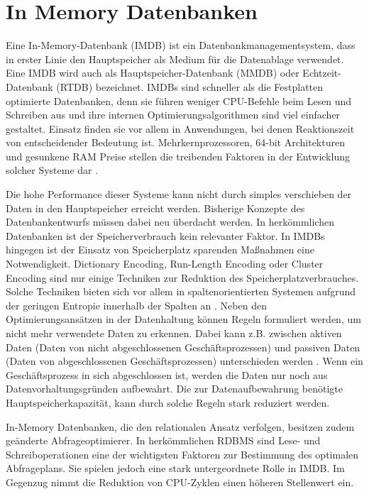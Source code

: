 \section{In Memory Datenbanken}
\label{ch:grundlagen:sec:InMemoryDatenbanken}

Eine In-Memory-Datenbank (IMDB) ist ein Datenbankmanagementsystem, dass in erster Linie den Hauptspeicher als Medium für die Datenablage verwendet. Eine IMDB wird auch als Hauptspeicher-Datenbank (MMDB) oder Echtzeit-Datenbank (RTDB) bezeichnet. IMDBs sind schneller als die Festplatten optimierte Datenbanken, denn sie führen weniger CPU-Befehle beim Lesen und Schreiben aus und ihre internen Optimierungsalgorithmen sind viel einfacher gestaltet. Einsatz finden sie vor allem in Anwendungen, bei denen Reaktionszeit von entscheidender Bedeutung ist. Mehrkernprozessoren, 64-bit Architekturen und gesunkene RAM Preise stellen die treibenden Faktoren in der Entwicklung solcher Systeme dar \cite{SWB-381840476}.

Die hohe Performance dieser Systeme kann nicht durch simples verschieben der Daten in den Hauptspeicher erreicht werden. Bisherige Konzepte des Datenbankentwurfs müssen dabei neu überdacht werden. In herkömmlichen Datenbanken ist der Speicherverbrauch kein relevanter Faktor. In IMDBs hingegen ist der Einsatz von Speicherplatz sparenden Maßnahmen eine Notwendigkeit. Dictionary Encoding, Run-Length Encoding oder Cluster Encoding sind nur einige Techniken zur Reduktion des Speicherplatzverbrauches. Solche Techniken bieten sich vor allem in spaltenorientierten Systemen aufgrund der geringen Entropie innerhalb der Spalten an \cite{Abadi:2006:ICE:1142473.1142548}. Neben den Optimierungsansätzen in der Datenhaltung können Regeln formuliert werden, um nicht mehr verwendete Daten zu erkennen. Dabei kann z.B. zwischen aktiven Daten (Daten von nicht abgeschlossenen Geschäftsprozessen) und passiven Daten (Daten von abgeschlossenen Geschäftsprozessen) unterschieden werden \cite{10.1109/ICDE.2013.6544811}. Wenn ein Geschäftsprozess in sich abgeschlossen ist, werden die Daten nur noch aus Datenvorhaltungsgründen aufbewahrt. Die zur Datenaufbewahrung benötigte Hauptspeicherkapazität, kann durch solche Regeln stark reduziert werden.
 
In-Memory Datenbanken, die den relationalen Ansatz verfolgen, besitzen zudem geänderte Abfrageoptimierer. In herkömmlichen RDBMS sind Lese- und Schreiboperationen eine der wichtigsten Faktoren zur Bestimmung des optimalen Abfrageplans. Sie spielen jedoch eine stark untergeordnete Rolle in IMDB. Im Gegenzug nimmt die Reduktion von CPU-Zyklen einen höheren Stellenwert ein.

